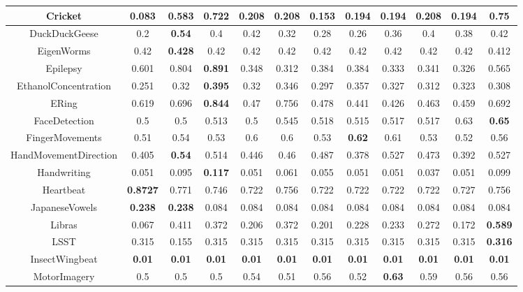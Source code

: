 \documentclass{svproc}
\begin{document}
\begin{table}[ht!]
\begin{adjustbox}{width=1.3\textwidth}
\begin{tabular}{||c@{\hskip 0.1in}c@{\hskip 0.1in}c@{\hskip 0.1in}c@{\hskip 0.1in}c@{\hskip 0.1in}c@{\hskip 0.1in}c@{\hskip 0.1in}c@{\hskip 0.1in}c@{\hskip 0.1in}c@{\hskip 0.1in}c@{\hskip 0.1in}c||}
    Cricket &  0.083 & 0.583 & 0.722 & 0.208 & 0.208 & 0.153 & 0.194 & 0.194 & 0.208 & 0.194 & \textbf{0.75} \\ 
    \hline
    DuckDuckGeese &  0.2 & \textbf{0.54} &0.4& 0.42 & 0.32 & 0.28 & 0.26 & 0.36 & 0.4 & 0.38 & 0.42 \\ 
    \hline
    EigenWorms &  0.42 & \textbf{0.428} & 0.42 & 0.42 & 0.42 & 0.42 & 0.42 & 0.42 & 0.42 & 0.42 & 0.412 \\ 
    \hline
    Epilepsy &  0.601 & 0.804 & \textbf{0.891} & 0.348 & 0.312 & 0.384 & 0.384 & 0.333 & 0.341 & 0.326 & 0.565 \\ 
    \hline
    EthanolConcentration &  0.251 & 0.32 &\textbf{0.395}& 0.32 & 0.346 & 0.297 & 0.357 & 0.327 & 0.312 & 0.323 & 0.308 \\  
    \hline
    ERing&  0.619 & 0.696 &\textbf{0.844}& 0.47 & 0.756 & 0.478 & 0.441 & 0.426 & 0.463 & 0.459 & 0.692 \\  
    \hline
    FaceDetection &  0.5 & 0.5 &0.513& 0.5 & 0.545 & 0.518 & 0.515 & 0.517 & 0.517 & 0.63 & \textbf{0.65} \\ 
    \hline
    FingerMovements &  0.51 & 0.54 & 0.53& 0.6 & 0.6 & 0.53 & \textbf{0.62} & 0.61 & 0.53 & 0.52 & 0.56 \\  
    \hline
    HandMovementDirection &  0.405 & \textbf{0.54} &0.514& 0.446 & 0.46 & 0.487 & 0.378 & 0.527 & 0.473 & 0.392 & 0.527 \\ 
    \hline
    Handwriting &  0.051 & 0.095 &\textbf{0.117}& 0.051 & 0.061 & 0.055 & 0.051 & 0.051 & 0.037 & 0.051 & 0.099 \\ 
    \hline
    Heartbeat &  \textbf{0.8727} & 0.771 &0.746& 0.722 & 0.756 & 0.722 & 0.722 & 0.722 & 0.722 & 0.727 & 0.756 \\  
    \hline
    JapaneseVowels &  \textbf{0.238} & \textbf{0.238} &0.084& 0.084 & 0.084 & 0.084 & 0.084 & 0.084 & 0.084 & 0.084 & 0.084 \\ 
    \hline
    Libras &  0.067 & 0.411 &0.372& 0.206 & 0.372 & 0.201 & 0.228 & 0.233 & 0.272 & 0.172 & \textbf{0.589} \\ 
    \hline
    LSST &  0.315 & 0.155 &0.315& 0.315 & 0.315 & 0.315 & 0.315 & 0.315 & 0.315 & 0.315 & \textbf{0.316} \\  
    \hline
    InsectWingbeat &  \textbf{0.01} & \textbf{0.01} &\textbf{0.01}& \textbf{0.01} & \textbf{0.01} & \textbf{0.01} & \textbf{0.01} & \textbf{0.01} & \textbf{0.01} & \textbf{0.01} & \textbf{0.01} \\  
    \hline
    MotorImagery &  0.5 & 0.5 &0.5& 0.54 & 0.51 & 0.56 & 0.52 & \textbf{0.63} & 0.59 & 0.56 & 0.56 \\ 

\end{tabular}
\end{adjustbox}
\end{table}
\end{document}
